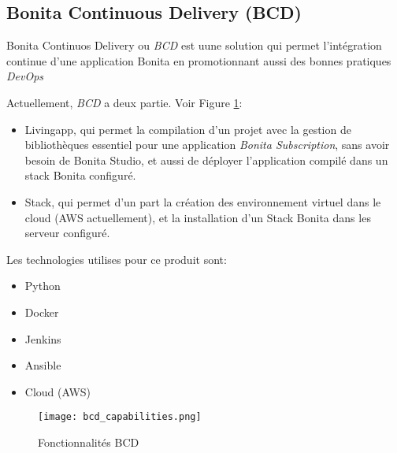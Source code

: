 \subsection{Bonita Continuous Delivery (BCD)}
Bonita Continuos Delivery ou \textit{BCD} est uune solution qui permet l'intégration continue d'une application Bonita en promotionnant aussi des bonnes pratiques \emph{DevOps}

Actuellement, \textit{BCD} a deux partie. Voir Figure \ref{fig:bcd_cap}:
\begin{itemize}
  \item Livingapp, qui permet la compilation d'un projet avec la gestion de bibliothèques essentiel pour une application \textit{Bonita Subscription}, sans avoir besoin de Bonita Studio, et aussi de déployer l'application compilé dans un stack Bonita configuré.
  \item Stack, qui permet d'un part la création des environnement virtuel dans le cloud (AWS actuellement), et la installation d'un Stack Bonita dans les serveur configuré.
\end{itemize}

Les technologies utilises pour ce produit sont:
\begin{itemize}
  \item Python
  \item Docker
  \item Jenkins
  \item Ansible
  \item Cloud (AWS)
\end{itemize}

\begin{figure}[!ht]
\centering
\texttt{[image: bcd\_capabilities.png]}
\caption{Fonctionnalités BCD}
\label{fig:bcd_cap}
\end{figure}

